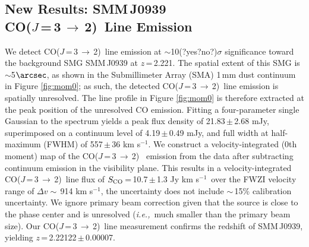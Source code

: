 \documentclass[twocolumn,apj,numberedappendix]{emulateapj}
\newcommand{\CO}{\mbox{CO($J$\,=\,3\,$\rightarrow$\,2) }}
\newcommand{\ie}{{\sl i.e.,~}}
\newcommand{\pmOne}{\mbox{$^{-1}$}}
\begin{document}
\subsection{New Results: SMM\,J0939\\ \CO Line Emission}
We detect \CO line emission at $\sim$10(?yes?no?)$\sigma$ significance toward the background SMG SMM\,J0939 at $z$\,=\,2.221.
The spatial extent of this SMG is $\sim$5$\arcsec$, as shown in the Submillimeter Array (SMA) 1\,mm dust continuum in Figure \ref{fig:mom0}; as such, the detected \CO line emission is spatially unresolved. 
The line profile in Figure \ref{fig:mom0} is therefore extracted at the peak position of the unresolved CO emission. Fitting a four-parameter single Gaussian to the spectrum yields a peak flux density of 21.83\,$\pm$\,2.68\,\,mJy, superimposed on a continuum level of 4.19\,$\pm$\,0.49\,\,mJy, and full width at half-maximum (FWHM) of 557\,$\pm$\,36\,\,km\,\,s\pmOne. 
We construct a velocity-integrated (0th moment) map of the \CO 
emission from the data after subtracting continuum emission in the visibility plane. This results in a velocity-integrated \CO line flux of $S_{\rm CO}$\,=\,10.7\,$\pm$\,1.3 Jy km\,\,s\pmOne\ over the FWZI velocity range of $\Delta v\sim$\,914 km\,\,s\pmOne, the uncertainty does not include $\sim$\,15\% calibration uncertainty. We ignore primary beam correction given that the source is close to the phase center and is unresolved (\ie much smaller than the primary beam size). Our \CO line measurement confirms the redshift of SMM\,J0939, yielding $z$\,=\,2.22122\,$\pm$\,0.00007.
\end{document}
